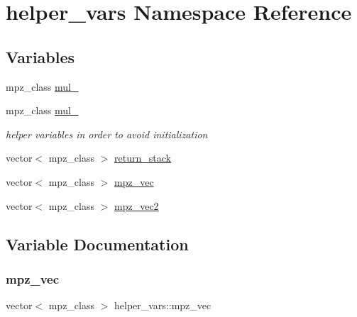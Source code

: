 \hypertarget{namespacehelper__vars}{}\section{helper\+\_\+vars Namespace Reference}
\label{namespacehelper__vars}
\subsection*{Variables}
\begin{DoxyCompactItemize}
\item 
mpz\+\_\+class \hyperlink{namespacehelper__vars_af190146bcb041e9501bb622fd0a70e1e}{mul\+\_}
\item 
mpz\+\_\+class \hyperlink{namespacehelper__vars_a3ef4720a3a8f70853c651c0bba5107b2}{mul\+\_}
\begin{DoxyCompactList}\small\item\em helper variables in order to avoid initialization \end{DoxyCompactList}\item 
vector$<$ mpz\+\_\+class $>$ \hyperlink{namespacehelper__vars_a6d2100c373830cacd232319a9958652d}{return\+\_\+stack}
\item 
vector$<$ mpz\+\_\+class $>$ \hyperlink{namespacehelper__vars_a54af4d4cefd8ae34c16c2b89992da473}{mpz\+\_\+vec}
\item 
vector$<$ mpz\+\_\+class $>$ \hyperlink{namespacehelper__vars_ae0c8e9c39baed3d84b0f24cb7ef4c3e9}{mpz\+\_\+vec2}
\end{DoxyCompactItemize}


\subsection{Variable Documentation}
\mbox{\label{namespacehelper__vars_a54af4d4cefd8ae34c16c2b89992da473}} 
\subsubsection{\texorpdfstring{mpz\+\_\+vec}{mpz\_vec}}
{\footnotesize\ttfamily vector$<$ mpz\+\_\+class $>$ helper\+\_\+vars\+::mpz\+\_\+vec}

\mbox{\label{namespacehelper__vars_ae0c8e9c39baed3d84b0f24cb7ef4c3e9}} 
